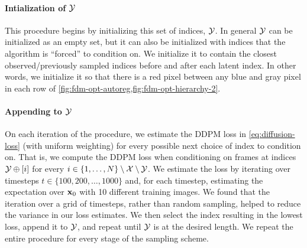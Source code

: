 \paragraph{Intialization of $\mathcal{Y}$}
This procedure begins by initializing this set of indices, $\mathcal{Y}$. In general $\mathcal{Y}$ can be initialized as an empty set, but it can also be initialized with indices that the algorithm is ``forced'' to condition on. We initialize it to contain the closest observed/previously sampled indices before and after each latent index. In other words, we initialize it so that there is a red pixel between any blue and gray pixel in each row of \cref{fig:fdm-opt-autoreg,fig:fdm-opt-hierarchy-2}.

\paragraph{Appending to $\mathcal{Y}$}
On each iteration of the procedure, we estimate the DDPM loss in \cref{eq:diffusion-loss} (with uniform weighting) for every possible next choice of index to condition on. That is, we compute the DDPM loss when conditioning on frames at indices ${\mathcal{Y} \oplus [i]}$ for every ${i\in\{1,\ldots,N\}\setminus\mathcal{X}\setminus\mathcal{Y}}$. We estimate the loss by iterating over timesteps ${t \in \{100,200,\ldots,1000\}}$ and, for each timestep, estimating the expectation over ${\mathbf{x}}_0$ with 10 different training images. We found that the iteration over a grid of timesteps, rather than random sampling, helped to reduce the variance in our loss estimates. We then select the index resulting in the lowest loss, append it to $\mathcal{Y}$, and repeat until $\mathcal{Y}$ is at the desired length. We repeat the entire procedure for every stage of the sampling scheme.

